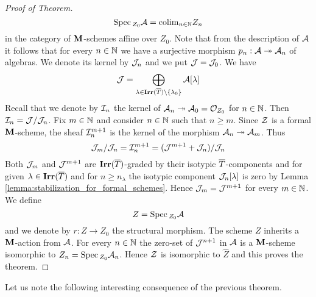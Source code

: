 \begin{proof}[Proof of Theorem]
$$\mathrm{Spec}\,_{Z_0}{\mathcal A} = \mathrm{colim}_{n\in {\mathbb N}}Z_n$$
in the category of $\mathbf{M}$-schemes affine over $Z_0$. Note that from the description of ${\mathcal A}$ it follows that for every $n\in {\mathbb N}$ we have a surjective morphism $p_n:{\mathcal A}\twoheadrightarrow {\mathcal A}_n$ of algebras. We denote its kernel by ${\mathcal J}_n$ and we put ${\mathcal J} = {\mathcal J}_0$. We have
$${\mathcal J}=\bigoplus_{\lambda \in \mathbf{Irr}(\overline{T})\setminus \{\lambda_0\}}{\mathcal A}[\lambda]$$
Recall that we denote by ${\mathcal I}_n$ the kernel of ${\mathcal A}_n\twoheadrightarrow {\mathcal A}_0={\mathcal O}_{Z_0}$ for $n\in {\mathbb N}$. Then ${\mathcal I}_n={\mathcal J}/{\mathcal J}_n$. Fix $m\in {\mathbb N}$ and consider $n\in {\mathbb N}$ such that $n\geq m$. Since ${\mathcal Z}$ is a formal $\mathbf{M}$-scheme, the sheaf ${\mathcal I}_n^{m+1}$ is the kernel of the morphism ${\mathcal A}_n\twoheadrightarrow {\mathcal A}_m$. Thus
$${\mathcal J}_m/{\mathcal J}_n={\mathcal I}_n^{m+1}=({\mathcal J}^{m+1}+{\mathcal J}_n)/{\mathcal J}_n$$
Both ${\mathcal J}_m$ and ${\mathcal J}^{m+1}$ are $\mathbf{Irr}(\overline{T})$-graded by their isotypic $\overline{T}$-components and for given $\lambda\in \mathbf{Irr}(\overline{T})$ and for $n \geq n_{\lambda}$ the isotypic component ${\mathcal J}_n[\lambda]$ is zero by Lemma \ref{lemma:stabilization_for_formal_schemes}. Hence ${\mathcal J}_m={\mathcal J}^{m+1}$ for every $m \in {\mathbb N}$.
We define
$$Z=\mathrm{Spec}\,_{Z_0}{\mathcal A}$$
and we denote by $r:Z\to Z_0$ the structural morphism. The scheme $Z$ inherits a $\mathbf{M}$-action from ${\mathcal A}$. For every $n\in {\mathbb N}$ the zero-set of ${\mathcal J}^{n+1}$ in ${\mathcal A}$ is a $\mathbf{M}$-scheme isomorphic to $Z_n = \mathrm{Spec}\,_{Z_0}{\mathcal A}_n$. Hence ${\mathcal Z}$ is isomorphic to $\widehat{Z}$ and this proves the theorem.
\end{proof}
\noindent
Let us note the following interesting consequence of the previous theorem.

